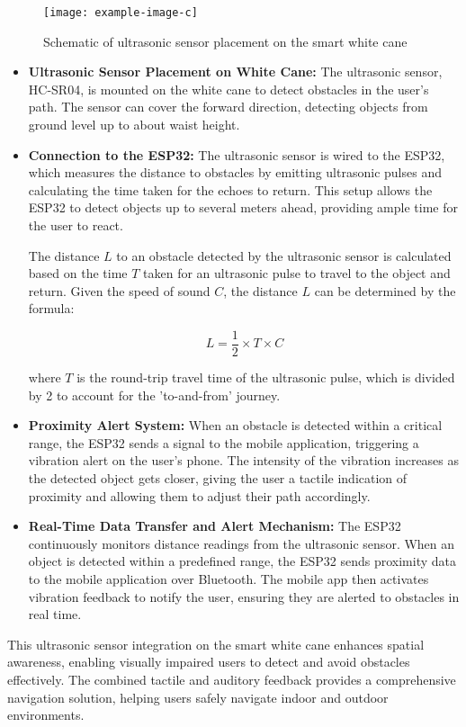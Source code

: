 \begin{figure}[h!]
	\centering
	\texttt{[image: example-image-c]}
	\caption{Schematic of ultrasonic sensor placement on the smart white cane}
	\label{fig:ultrasonic_schematics}
\end{figure}

\begin{itemize}
	\item \textbf{Ultrasonic Sensor Placement on White Cane:} The ultrasonic sensor, HC-SR04, is mounted on the white cane to detect obstacles in the user’s path. The sensor can cover the forward direction, detecting objects from ground level up to about waist height.
	
	\item \textbf{Connection to the ESP32:} The ultrasonic sensor is wired to the ESP32, which measures the distance to obstacles by emitting ultrasonic pulses and calculating the time taken for the echoes to return. This setup allows the ESP32 to detect objects up to several meters ahead, providing ample time for the user to react.
	
	The distance \( L \) to an obstacle detected by the ultrasonic sensor is calculated based on the time \( T \) taken for an ultrasonic pulse to travel to the object and return. Given the speed of sound \( C \), the distance \( L \) can be determined by the formula:
	
	\[
	L = \frac{1}{2} \times T \times C
	\]
	
	where \( T \) is the round-trip travel time of the ultrasonic pulse, which is divided by 2 to account for the 'to-and-from' journey.
	
	
	
	
	\item \textbf{Proximity Alert System:} When an obstacle is detected within a critical range, the ESP32 sends a signal to the mobile application, triggering a vibration alert on the user’s phone. The intensity of the vibration increases as the detected object gets closer, giving the user a tactile indication of proximity and allowing them to adjust their path accordingly.
	
	\item \textbf{Real-Time Data Transfer and Alert Mechanism:} The ESP32 continuously monitors distance readings from the ultrasonic sensor. When an object is detected within a predefined range, the ESP32 sends proximity data to the mobile application over Bluetooth. The mobile app then activates vibration feedback to notify the user, ensuring they are alerted to obstacles in real time.
\end{itemize}

This ultrasonic sensor integration on the smart white cane enhances spatial awareness, enabling visually impaired users to detect and avoid obstacles effectively. The combined tactile and auditory feedback provides a comprehensive navigation solution, helping users safely navigate indoor and outdoor environments.



